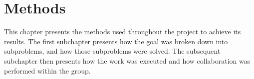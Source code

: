 \chapter{Methods}

This chapter presents the methods used throughout the project to achieve its results.
The first subchapter presents how the goal was broken down into subproblems, and how those subproblems were solved.
The subsequent subchapter then presents how the work was executed and how collaboration was performed within the group.


